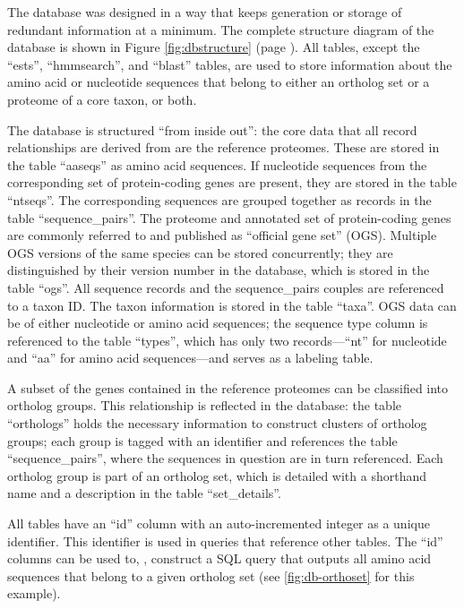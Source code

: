 \label{sec:database-structure}
The database was designed in a way that keeps generation or storage of redundant
information at a minimum. The complete structure diagram of the database is
shown in Figure \ref{fig:dbstructure} (page \pageref{fig:dbstructure}). All
tables, except the ``ests'', ``hmmsearch'', and ``blast'' tables, are used to
store information about the amino acid or nucleotide sequences that belong to
either an ortholog set or a proteome of a core taxon, or both. 

The database is structured ``from inside out'': the core data that all record
relationships are derived from are the reference proteomes. These are stored in
the table ``aaseqs'' as amino acid sequences. If nucleotide sequences from the
corresponding set of protein-coding genes are present, they are stored in the
table ``ntseqs''. The corresponding sequences are grouped together as records in
the table ``sequence\_pairs''. The proteome and annotated set of protein-coding
genes are commonly referred to and published as ``official gene set'' (OGS).
Multiple OGS versions of the same species can be stored concurrently; they are
distinguished by their version number in the database, which is stored in the
table ``ogs''.  All sequence records and the sequence\_pairs couples are
referenced to a taxon ID. The taxon information is stored in the table ``taxa''.
OGS data can be of either nucleotide or amino acid sequences; the sequence type
column is referenced to the table ``types'', which has only two records---``nt''
for nucleotide and ``aa'' for amino acid sequences---and serves as a labeling
table.

A subset of the genes contained in the reference proteomes can be classified
into ortholog groups. This relationship is reflected in the database: the table
``orthologs'' holds the necessary information to construct clusters of ortholog
groups; each group is tagged with an identifier and references the table
``sequence\_pairs'', where the sequences in question are in turn referenced.
Each ortholog group is part of an ortholog set, which is detailed with a
shorthand name and a description in the table ``set\_details''.

All tables have an ``id'' column with an auto-incremented integer as a unique
identifier. This identifier is used in  queries that
reference other tables. The ``id'' columns can be used to, \eg, construct a
SQL query that outputs all amino acid sequences that belong to a given ortholog
set (see \autoref{fig:db-orthoset} for this example). 

